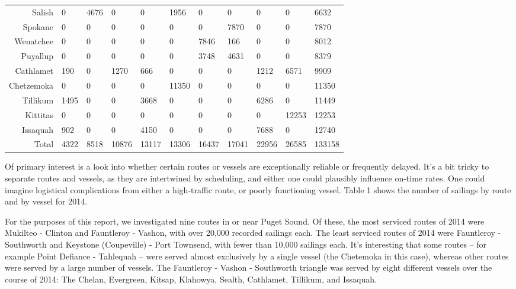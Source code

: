 \documentclass[11pt, letterpaper]{article}
\begin{document}
{\begin{landscape}
{\begin{tabular}{ | r | p{2cm} | p{1.6cm} | p{1.8cm} | p{1.9cm} | p{1.8cm} | p{1.9cm} | p{1.7cm} | p{1.7cm} | p{1.7cm} | p{1cm} |}
  Salish & 0 & 4676 & 0 & 0 & 1956 & 0 & 0 & 0 & 0 & 6632 \\ 
  Spokane & 0 & 0 & 0 & 0 & 0 & 0 & 7870 & 0 & 0 & 7870 \\ 
  Wenatchee & 0 & 0 & 0 & 0 & 0 & 7846 & 166 & 0 & 0 & 8012 \\ 
  Puyallup & 0 & 0 & 0 & 0 & 0 & 3748 & 4631 & 0 & 0 & 8379 \\ 
  Cathlamet & 190 & 0 & 1270 & 666 & 0 & 0 & 0 & 1212 & 6571 & 9909 \\ 
  Chetzemoka & 0 & 0 & 0 & 0 & 11350 & 0 & 0 & 0 & 0 & 11350 \\ 
  Tillikum & 1495 & 0 & 0 & 3668 & 0 & 0 & 0 & 6286 & 0 & 11449 \\ 
  Kittitas & 0 & 0 & 0 & 0 & 0 & 0 & 0 & 0 & 12253 & 12253 \\ 
  Issaquah & 902 & 0 & 0 & 4150 & 0 & 0 & 0 & 7688 & 0 & 12740 \\ 
\hline
   Total & 4322 & 8518 & 10876 & 13117 & 13306 & 16437 & 17041 & 22956 & 26585 & 133158 \\ 
   \hline
\end{tabular}
}

    \end{landscape}
    \clearpage%
}

Of primary interest is a look into whether certain routes or vessels are exceptionally reliable or frequently delayed. It's a bit tricky to separate routes and vessels, as they are intertwined by scheduling, and either one could plausibly influence on-time rates. One could imagine logistical complications from either a high-traffic route, or poorly functioning vessel. Table 1 shows the number of sailings by route and by vessel for 2014. 

For the purposes of this report, we investigated nine routes in or near Puget Sound. Of these, the most serviced routes of 2014 were Mukilteo - Clinton and Fauntleroy - Vashon, with over 20,000 recorded sailings each. The least serviced routes of 2014 were Fauntleroy - Southworth and Keystone (Coupeville) - Port Townsend, with fewer than 10,000 sailings each. It's interesting that some routes -- for example Point Defiance - Tahlequah -- were served almost exclusively by a single vessel (the Chetemoka in this case), whereas other routes were served by a large number of vessels. The Fauntleroy - Vashon - Southworth triangle was served by eight different vessels over the course of 2014: The Chelan, Evergreen, Kitsap, Klahowya, Sealth, Cathlamet, Tillikum, and Issaquah.
\end{document}
